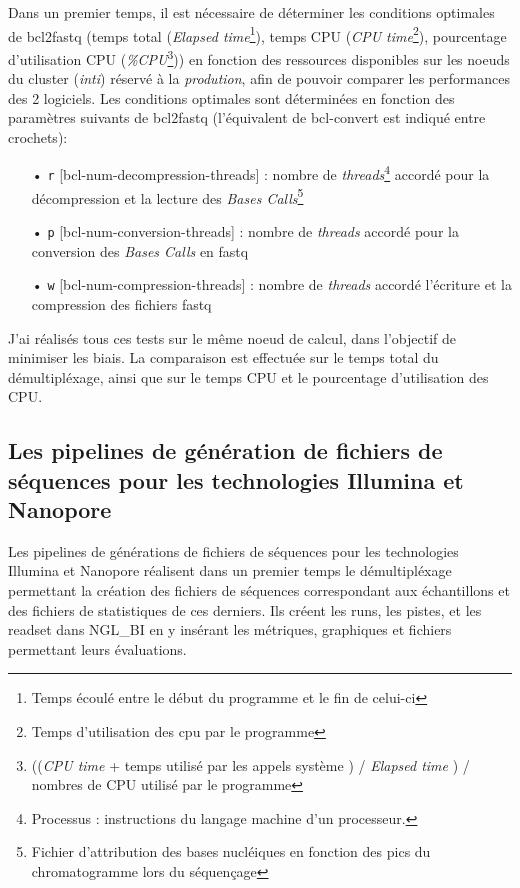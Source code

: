 Dans un premier temps, il est nécessaire de déterminer les conditions optimales de bcl2fastq (temps total (\emph{Elapsed time}\footnote{Temps écoulé entre le début du programme et le fin de celui-ci}), temps CPU (\emph{CPU time}\footnote{Temps d'utilisation des cpu par le programme}), pourcentage d'utilisation CPU (\emph{\%CPU}\footnote{((\emph{CPU time} + temps utilisé par les appels système ) / \emph{Elapsed time} ) / nombres de CPU utilisé par le programme})) en fonction des ressources disponibles sur les noeuds du cluster (\emph{inti}) réservé à la \emph{prodution}, afin de pouvoir comparer les performances des 2 logiciels. Les conditions optimales sont déterminées en fonction des paramètres suivants de bcl2fastq (l'équivalent de bcl-convert est indiqué entre crochets): \\
\begin{itemize}
    \item[•] \texttt{r} [bcl-num-decompression-threads] : nombre de \emph{threads}\footnote{Processus : instructions du langage machine d'un processeur.} accordé pour la décompression et la lecture des \emph{Bases Calls}\footnote{Fichier d'attribution des bases nucléiques en fonction des pics du chromatogramme lors du séquençage}
    \item[•] \texttt{p} [bcl-num-conversion-threads] : nombre de \emph{threads} accordé pour la conversion des \emph{Bases Calls} en fastq
    \item[•] \texttt{w} [bcl-num-compression-threads] : nombre de \emph{threads} accordé l'écriture et la compression des fichiers fastq\\
\end{itemize}

J'ai réalisés tous ces tests sur le même noeud de calcul, dans l'objectif de minimiser les biais. La comparaison est effectuée sur le temps total du démultipléxage, ainsi que sur le temps CPU et le pourcentage d'utilisation des CPU.

\subsection{Les pipelines de génération de fichiers de séquences pour les technologies Illumina et Nanopore}
Les pipelines de générations de fichiers de séquences pour les technologies Illumina et Nanopore réalisent dans un premier temps le démultipléxage permettant la création des fichiers de séquences correspondant aux échantillons et des fichiers de statistiques de ces derniers. Ils créent les runs, les pistes, et les readset dans NGL\_BI en y insérant les métriques, graphiques et fichiers permettant leurs évaluations.\\

